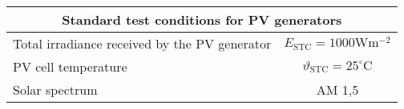 \footnotesize
\begin{tabular}{|l|c|}
	\hline
	\multicolumn{2}{|c|}{\textbf{Standard test conditions for PV generators}} \\
	\hline
 	Total irradiance received by the PV generator & $E_{\mathrm{STC}} = 1000\mathrm{W} \mathrm{m}^{-2}$ \\
	PV cell temperature & $\vartheta_{\mathrm{STC}} = 25^\circ \mathrm{C}$ \\
	Solar spectrum & AM 1,5 \\
	\hline
\end{tabular}